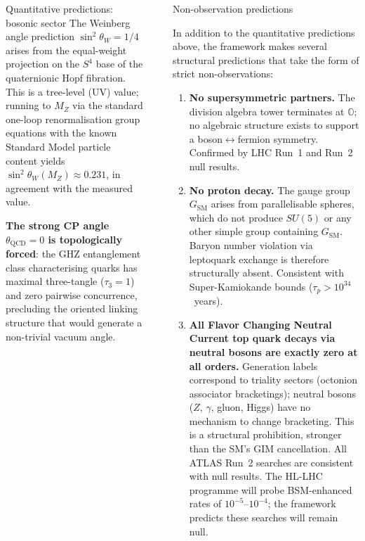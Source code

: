\documentclass[final]{beamer}
\newlength{\sepwidth}
\newlength{\colwidth}
\newcommand{\separatorcolumn}{\begin{column}{\sepwidth}\end{column}}
\begin{document}
\begin{frame}[t]
\begin{columns}[t]
\begin{column}{\colwidth}
\begin{block}{Quantitative predictions: bosonic sector}
The Weinberg angle prediction $\sin^2\!\theta_W = 1/4$ arises from the equal-weight projection on the $S^4$ base of the quaternionic Hopf fibration. This is a tree-level (UV) value; running to $M_Z$ via the standard one-loop renormalisation group equations with the known Standard Model particle content yields $\sin^2\!\theta_W(M_Z) \approx 0.231$, in agreement with the measured value.

\textbf{The strong CP angle $\theta_{\mathrm{QCD}} = 0$ is topologically forced}: the GHZ entanglement class characterising quarks has maximal three-tangle ($\tau_3 = 1$) and zero pairwise concurrence, precluding the oriented linking structure that would generate a non-trivial vacuum angle.
\end{block}
\end{column}

\separatorcolumn

\begin{column}{\colwidth}

\begin{block}{Non-observation predictions}

In addition to the quantitative predictions above, the framework makes several structural predictions that take the form of strict non-observations:

\begin{enumerate}
  \item \textbf{No supersymmetric partners.} The division algebra tower terminates at $\mathbb{O}$; no algebraic structure exists to support a boson$\leftrightarrow$fermion symmetry. Confirmed by LHC Run~1 and Run~2 null results.

  \item \textbf{No proton decay.} The gauge group $G_{\mathrm{SM}}$ arises from parallelisable spheres, which do not produce $SU(5)$ or any other simple group containing $G_{\mathrm{SM}}$. Baryon number violation via leptoquark exchange is therefore structurally absent. Consistent with Super-Kamiokande bounds ($\tau_p > 10^{34}$~years).

  \item \textbf{All Flavor Changing Neutral Current top quark decays via neutral bosons are exactly zero at all orders.} Generation labels correspond to triality sectors (octonion associator bracketings); neutral bosons ($Z$, $\gamma$, gluon, Higgs) have no mechanism to change bracketing. This is a structural prohibition, stronger than the SM's GIM cancellation. All ATLAS Run~2 searches are consistent with null results. The HL-LHC programme will probe BSM-enhanced rates of $10^{-5}$--$10^{-4}$; the framework predicts these searches will remain null.


\end{enumerate}
\end{block}
\end{column}
\end{columns}
\end{frame}
\end{document}
